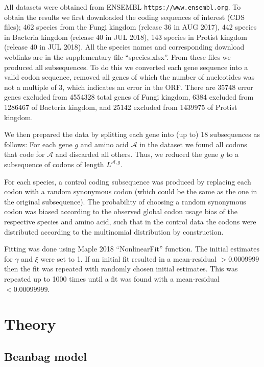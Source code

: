 \documentclass[a4paper,10pt]{paper}%
\begin{document}
All datasets  were obtained from  ENSEMBL {\tt https://www.ensembl.org}.  To obtain the results we first   downloaded the  coding sequences of interest (CDS files); 462 species from the  Fungi kingdom (release 36 in AUG 2017), 442 species in Bacteria kingdom (release 40 in JUL 2018), 143 species in Protist kingdom (release 40 in JUL 2018). All the species names and corresponding download weblinks are in the supplementary file ``species.xlsx''. From these files  we  produced  all  subsequences.  To do this  we converted  each gene sequence into a valid codon sequence, removed all genes of which the number of nucleotides was not a multiple of 3, which indicates an error in the ORF. There are 35748 error genes excluded from 4554328 total genes of Fungi kingdom, 6384 excluded from 1286467 of Bacteria kingdom, and 25142 excluded from 1439975 of Protist kingdom. 
\par
We then  prepared the data by  splitting each gene into  (up to) 18  subsequences  as follows: For each gene $g$ and amino acid $\mathcal A$  in the dataset we found all  codons that code for  $\mathcal A$  and discarded all others. Thus, we  reduced the gene $g$ to a subsequence of codons of length $L^{\mathcal A,g}$. 
\par
For each species, a control  coding subsequence was produced by replacing each codon with a random synonymous codon (which could be the same as the one in the original subsequence). The probability of choosing a random synonymous codon was biased according to the observed global codon usage bias of the respective species and amino acid, such that in the control data the codons were distributed according to the multinomial distribution by construction. 
\par
Fitting was done using Maple 2018 ``NonlinearFit'' function. The initial estimates for $\gamma$ and $\xi$ were set to 1. If an initial fit resulted in a mean-residual $>0.0009999$ then the fit was repeated with  randomly chosen initial estimates. This was repeated up to 1000 times until a fit was found with a mean-residual $<0.00099999$. 





\appendix


\section{Theory}



\subsection{Beanbag model}
\end{document}
